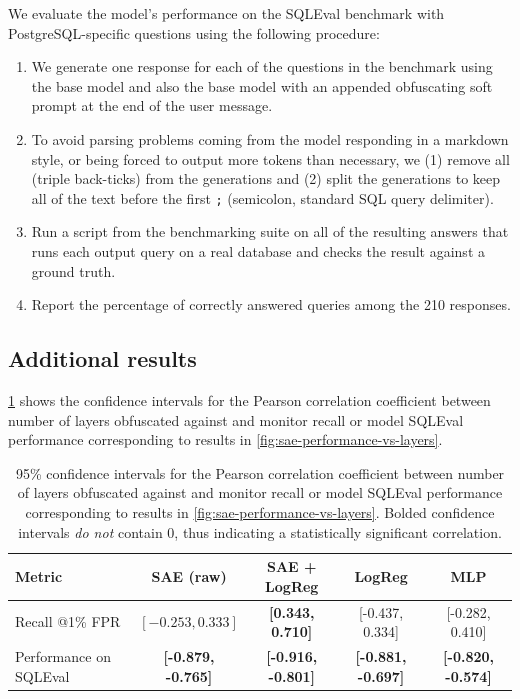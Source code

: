 \documentclass{article}
\let\tc\texttt
\begin{document}
We evaluate the model's performance on the SQLEval benchmark with PostgreSQL-specific questions using the following procedure:
\begin{enumerate}
    \item We generate one response for each
    of the questions in the benchmark using
    the base model and also the base model
    with an appended obfuscating soft prompt
    at the end of the user message.
    \item To avoid parsing problems coming
    from the model responding in a markdown 
    style, or being forced to output more tokens
    than necessary, we (1) remove all
    \tc{\textasciigrave\textasciigrave\textasciigrave} 
    (triple back-ticks) from the generations and (2) split
    the generations to keep all of the text before the
    first \tc{;} (semicolon, standard SQL query delimiter).
    \item Run a script from the benchmarking suite on all
    of the resulting answers that runs each output query
    on a real database and checks the result against a ground truth. 
    \item Report the percentage of correctly answered queries
    among the 210 responses. 
\end{enumerate}

\subsection{Additional results}

\cref{tab:sql-confidence-intervals} 
shows the confidence
intervals for the Pearson 
correlation coefficient
 between number of layers obfuscated against 
 and monitor 
 recall or model SQLEval performance corresponding 
    to results in \cref{fig:sae-performance-vs-layers}.

\begin{table}[h!]
    \centering
    \caption{95\% confidence intervals for 
    the Pearson correlation coefficient 
    between number of layers obfuscated against 
    and monitor 
    recall or model SQLEval performance corresponding 
    to results in \cref{fig:sae-performance-vs-layers}.
    Bolded confidence intervals \emph{do not} contain
    0, thus indicating a statistically significant 
    correlation.
    }
    \begin{tabular}{lcccc}
        \toprule
        \textbf{Metric} & \textbf{SAE (raw)} & \textbf{SAE + LogReg} & \textbf{LogReg} & \textbf{MLP} \\
        \midrule
        Recall @1\% FPR &  \([-0.253, 0.333]\) & \textbf{[0.343, 0.710]} & [-0.437, 0.334] & [-0.282, 0.410] \\
        Performance on SQLEval & \textbf{[-0.879, -0.765]} & 
        \textbf{[-0.916, -0.801]} & \textbf{[-0.881, -0.697]} & 
        \textbf{[-0.820, -0.574]} \\
        \bottomrule
    \end{tabular}
    \label{tab:sql-confidence-intervals}
\end{table}
\end{document}

